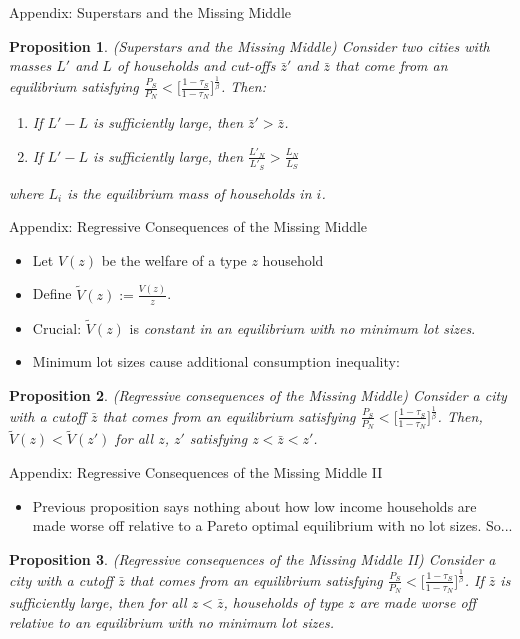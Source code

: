 \documentclass{beamer}
\theoremstyle{plain}
\newtheorem{prop}{Proposition}
\begin{document}
\begin{frame}{Appendix: Superstars and the Missing Middle}
	\begin{prop}
		(Superstars and the Missing Middle) Consider two cities with masses $L'$ and $L$ of households and cut-offs $\bar{z}'$ and $\bar{z}$ that come from an equilibrium satisfying $\frac{P_{S}}{P_{N}} < \bigg[\frac{1-\tau_{S}}{1-\tau_{N}}\bigg]^{\frac{1}{\beta}}$. Then:
		\begin{enumerate}
			\item If $L' - L$ is sufficiently large, then $\bar{z}' > \bar{z}$.
			\item  If $L' - L$ is sufficiently large, then $\frac{L'_{N}}{L'_{S}} > \frac{L_{N}}{L_{S}}$ 
		\end{enumerate} 
		where $L_{i}$ is the equilibrium mass of households in $i$.
	\end{prop}	
\end{frame}


\begin{frame}{Appendix: Regressive Consequences of the Missing Middle}
	\begin{itemize}
		\item Let $V(z)$ be the welfare of a type $z$ household
		\item Define $\tilde{V}(z) := \frac{V(z)}{z}$. 
		\item Crucial: $\tilde{V}(z)$ is \textit{constant in an equilibrium with no minimum lot sizes}. 
		\item Minimum lot sizes cause additional consumption inequality: 
	\end{itemize}
\begin{prop}\label{regressive}
	(Regressive consequences of the Missing Middle) Consider a city with a cutoff $\bar{z}$ that comes from an equilibrium satisfying $\frac{P_{S}}{P_{N}} < \bigg[\frac{1-\tau_{S}}{1-\tau_{N}}\bigg]^{\frac{1}{\beta}}$. Then, $\tilde{V}(z) < \tilde{V}(z')$ for all $z$, $z'$ satisfying $z < \bar{z} < z'$.
\end{prop}
\end{frame}

\begin{frame}{Appendix: Regressive Consequences of the Missing Middle II}
\begin{itemize}
	\item Previous proposition says nothing about how low income households are made worse off relative to a Pareto optimal equilibrium with no lot sizes. So... \pause
\end{itemize}
\begin{prop}\label{regressiveII}
	(Regressive consequences of the Missing Middle II) Consider a city with a cutoff $\bar{z}$ that comes from an equilibrium satisfying  $\frac{P_{S}}{P_{N}} < \bigg[\frac{1-\tau_{S}}{1-\tau_{N}}\bigg]^{\frac{1}{\beta}}$. If $\bar{z}$ is sufficiently large, then for all $z < \bar{z}$, households of type $z$ are made worse off relative to an equilibrium with no minimum lot sizes. 
\end{prop}
\end{frame}


\end{document}
